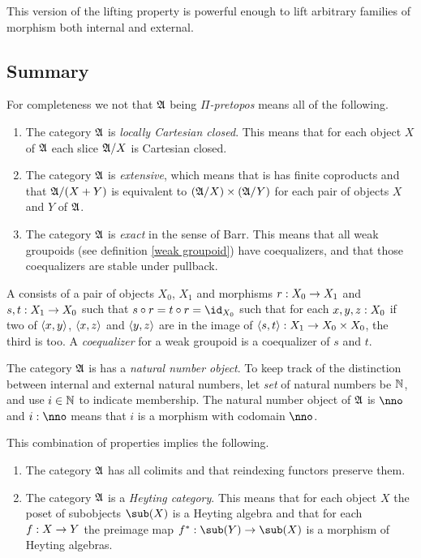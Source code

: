 \documentclass[csh.tex]{subfiles}
\begin{document}
This version of the lifting property is powerful enough to lift arbitrary families of morphism both internal and external.

\subsection{Summary}
For completeness we not that $\mathfrak A$ being \emph{$\Pi$-pretopos} means all of the following.

\begin{enumerate}
\item The category $\mathfrak A$ is \emph{locally Cartesian closed}. This means that for each object $X$ of $\mathfrak A$ each slice $\mathfrak A/X$ is Cartesian closed.
\item The category $\mathfrak A$ is \emph{extensive}, which means that is has finite coproducts and that $\mathfrak A/(X+Y)$ is equivalent to $(\mathfrak A/X)\times(\mathfrak A/Y)$ for each pair of objects $X$ and $Y$ of $\mathfrak A$.
\item The category $\mathfrak A$ is \emph{exact} in the sense of Barr. This means that all weak groupoids (see definition \ref{weak groupoid}) have coequalizers, and that those coequalizers are stable under pullback.
\end{enumerate}

\begin{definition} A  consists of a pair of objects $X_0$, $X_1$ and morphisms $r: X_0\to X_1$ and $s,t: X_1\to X_0$ such that $s\circ r= t\circ r = \id_{X_0}$ such that for each $x,y,z: X_0$ if two of $\left\langle x,y \right\rangle$, $\left\langle x,z \right\rangle$ and $\left\langle y,z \right\rangle$ are in the image of $\left\langle s,t \right\rangle: X_1\to X_0\times X_0$, the third is too. A \emph{coequalizer} for a weak groupoid is a coequalizer of $s$ and $t$.
\end{definition}

The category $\mathfrak A$ is has a \emph{natural number object}. To keep track of the distinction between internal and external natural numbers, let \emph{set} of natural numbers be $\mathbb N$, and use $i\in \mathbb N$ to indicate membership. The natural number object of $\mathfrak A$ is $\nno$ and $i\of\nno$ means that $i$ is a morphism with codomain $\nno$.

This combination of properties implies the following.
\begin{enumerate}
\item The category $\mathfrak A$ has all colimits and that reindexing functors preserve them. 
\item The category $\mathfrak A$ is a \emph{Heyting category}. This means that for each object $X$ the poset of subobjects $\sub(X)$ is a Heyting algebra and that for each $f: X\to Y$ the preimage map $f\ri\of\sub(Y)\to\sub(X)$ is a morphism of Heyting algebras.  
\end{enumerate}
\end{document}
